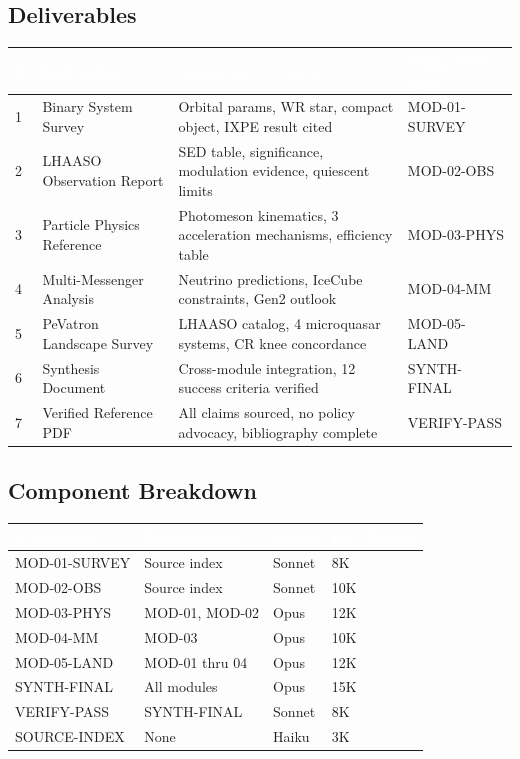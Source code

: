 \documentclass[11pt,letterpaper]{article}
\newcommand{\tableheader}[1]{\textbf{\sffamily\textcolor{white}{#1}}}
\begin{document}
\subsection{Deliverables}

\begin{center}
\begin{tabularx}{\textwidth}{C{0.6cm}L{3.5cm}L{3.5cm}X}
\toprule
{}
\tableheader{\#} & \tableheader{Deliverable} & \tableheader{Acceptance Criteria} & \tableheader{Component Spec} \\
 & Binary System Survey & Orbital params, WR star, compact object, IXPE result cited & MOD-01-SURVEY \\
2 & LHAASO Observation Report & SED table, significance, modulation evidence, quiescent limits & MOD-02-OBS \\
3 & Particle Physics Reference & Photomeson kinematics, 3 acceleration mechanisms, efficiency table & MOD-03-PHYS \\
4 & Multi-Messenger Analysis & Neutrino predictions, IceCube constraints, Gen2 outlook & MOD-04-MM \\
5 & PeVatron Landscape Survey & LHAASO catalog, 4 microquasar systems, CR knee concordance & MOD-05-LAND \\
6 & Synthesis Document & Cross-module integration, 12 success criteria verified & SYNTH-FINAL \\
7 & Verified Reference PDF & All claims sourced, no policy advocacy, bibliography complete & VERIFY-PASS \\
\end{tabularx}
\end{center}

\subsection{Component Breakdown}

\begin{center}
\begin{tabularx}{\textwidth}{L{3.5cm}L{3cm}C{2cm}C{2cm}}
\toprule
{}
\tableheader{Component} & \tableheader{Dependencies} & \tableheader{Model} & \tableheader{Est.\ Tokens} \\
\midrule
MOD-01-SURVEY & Source index & Sonnet & 8K \\
MOD-02-OBS & Source index & Sonnet & 10K \\
MOD-03-PHYS & MOD-01, MOD-02 & Opus & 12K \\
MOD-04-MM & MOD-03 & Opus & 10K \\
MOD-05-LAND & MOD-01 thru 04 & Opus & 12K \\
SYNTH-FINAL & All modules & Opus & 15K \\
VERIFY-PASS & SYNTH-FINAL & Sonnet & 8K \\
SOURCE-INDEX & None & Haiku & 3K \\
\bottomrule
\end{tabularx}
\end{center}
\end{document}
